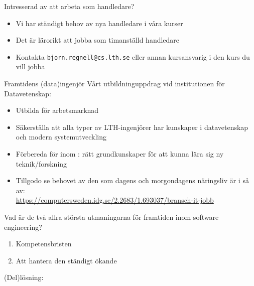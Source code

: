 \begin{Slide}{Intresserad av att arbeta som handledare?}
\begin{itemize}
\item Vi har ständigt behov av nya handledare i våra kurser
\item Det är lärorikt att jobba som timanställd handledare
\item Kontakta \verb|bjorn.regnell@cs.lth.se| eller annan kursansvarig i den kurs du vill jobba
\end{itemize}
\end{Slide}


\begin{Slide}{Framtidens (data)ingenjör}
Vårt utbildninguppdrag vid institutionen för Datavetenskap:
\begin{itemize}
  \item Utbilda  för  arbetsmarknad
  \item Säkerställa att alla typer av LTH-ingenjörer har  kunskaper i datavetenskap och modern systemutveckling
  \item Förbereda för  inom : rätt grundkunskaper för att kunna lära sig ny teknik/forskning
  \item Tillgodo se behovet av den  som dagens och morgondagens näringsliv är i så  av: \\
  \url{https://computersweden.idg.se/2.2683/1.693037/bransch-it-jobb} \\
\end{itemize}
\end{Slide}

\begin{Slide}{Vad är de två allra största utmaningarna för framtiden inom software engineering?}
  \begin{enumerate}
    \item Kompetensbristen
    \item
    \pause Att hantera den ständigt ökande 
  \end{enumerate}
  \pause(Del)lösning: \pause {}
\end{Slide}


